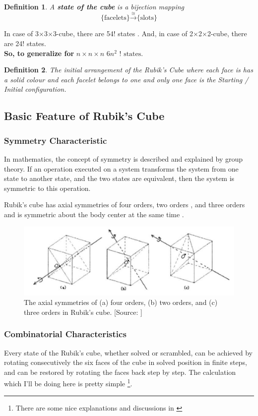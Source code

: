 \documentclass[12pt,a4paper]{article}
\theoremstyle{custom}
\newtheorem*{definition}{Definition}
\newcommand{\Ttwo}{2$\times$2$\times$2-}
\newcommand{\Tthree}{3$\times$3$\times$3-}
\begin{document}
\begin{definition}
    A \textbf{state of the cube} is a bijection mapping 
    $$\boxed{
\text{\{facelets\}} \xrightarrow{\cong} \text{\{slots\}}
}$$
\end{definition}
  In case of \Tthree cube, there are 54! states \cite{anu}. And, in case of \Ttwo cube, there are 24! states. \\
\textbf{So, to generalize for } $n \times n \times n$  $6n^2$ $\text{! states.}$


\begin{definition}
    The initial arrangement of the Rubik's Cube where each face is has a solid colour and each facelet belongs to one and only one face is the Starting / Initial configuration. \end{definition}


\subsection{Basic Feature of Rubik's Cube} 
\subsubsection{Symmetry Characteristic}
In mathematics, the concept of symmetry is described and explained by group theory. 
If an operation executed on a system transforms the system from one state to another state, and the two states are equivalent, then the system is symmetric to this operation.

Rubik’s cube has axial symmetries of four orders, two orders
, and three orders and is symmetric about the body center at the same time \cite{Hu,singmaster1980notes}.


\begin{figure}[H]
\centering
\includegraphics[scale=0.5]{Symmetry.png}
\caption{The axial symmetries of (a) four orders, (b) two orders, and (c) three orders in Rubik’s cube. [Source: \cite{Hu}]}
\label{symm}
\end{figure}

\subsubsection{Combinatorial Characteristics}
Every state of the Rubik’s cube, whether solved or scrambled, can be achieved by rotating consecutively the six faces of the cube in solved position in finite steps, and can be restored by rotating the faces back step by step. The calculation which I'll be doing here is pretty simple \footnote{There are some nice explanations and discussions in \cite{hoda2010finding, animesh2018calculating, JC, 2018ChJME..31...77Z}}. 
\end{document}
